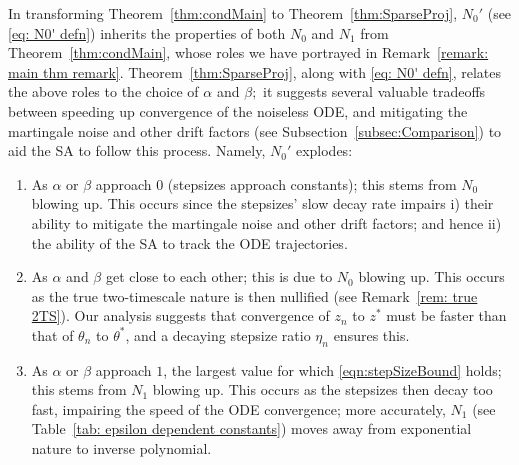 \documentclass[usenames,dvipsnames,final,12pt]{colt2018} %
\newcommand{\lt}{q_1}
\newcommand{\thS}{\theta^*}
\newcommand{\lz}{q_2}
\newcommand{\zS}{z^*}
\newcommand{\gal}[1]{#1}
\newcommand{\gugan}[1]{#1}
\begin{document}
	\gal{In \gugan{transforming} Theorem~\ref{thm:condMain} to Theorem~\ref{thm:SparseProj}, $N_0'$ (\gugan{see} \eqref{eq: N0' defn}) inherits \gugan{the} properties of both $N_0$ and $N_1$ from Theorem~\ref{thm:condMain}, whose roles we have portrayed in  Remark~\ref{remark: main thm remark}. Theorem~\ref{thm:SparseProj}, along with \eqref{eq: N0' defn}, relates the above roles to \gugan{the} choice of $\alpha$ and $\beta;$ it suggests several valuable tradeoffs between speeding up convergence of the noiseless ODE, and mitigating the martingale noise \gugan{and other drift factors (see Subsection~\ref{subsec:Comparison})} to aid the SA to follow this process. Namely, $N_0'$ explodes:}
\begin{enumerate}
\item \gal{As $\alpha$ or $\beta$ approach $0$ (stepsizes approach constants); this stems from $N_0$ blowing up. This occurs} since the stepsizes' slow decay rate impairs i) their ability to mitigate the martingale noise \gugan{and other drift factors}; and hence ii) the ability of the SA to \gugan{track} the ODE trajectories.

\item \gal{As $\alpha$ and $\beta$ get close to each other; this is due to $N_0$ blowing up. This occurs} \gugan{as} the \gugan{true} two-timescale nature is \gugan{then} nullified (see Remark~\ref{rem: true 2TS}).  Our analysis suggests that convergence of $z_n$ to $\zS$ \gugan{must} be faster than that of $\theta_n$ to $\thS$, \gugan{and a decaying stepsize ratio $\eta_n$ ensures this.}

\item \gal{As $\alpha$ or $\beta$ approach $1$, the largest value for which \eqref{eqn:stepSizeBound} \gugan{holds}; this stems from $N_1$ blowing up. This occurs} \gugan{as} the stepsizes then decay too fast, impairing the speed of the ODE convergence; more accurately, $N_1$ (see Table~\ref{tab: epsilon dependent constants}) moves away from exponential nature to inverse polynomial.
\end{enumerate}
\end{document}

